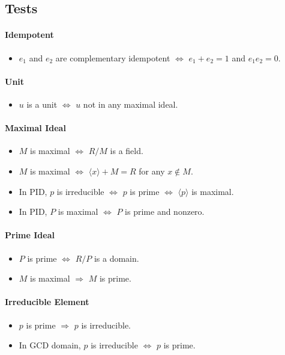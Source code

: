 \documentclass{article}
\begin{document}
\subsection*{Tests}

\paragraph*{Idempotent}
\begin{itemize}
    \item $e_1$ and $e_2$ are complementary idempotent $\Leftrightarrow$ $e_1+e_2=1$ and $e_1 e_2 = 0$.
\end{itemize}

\paragraph*{Unit}
\begin{itemize}
    \item $u$ is a unit $\Leftrightarrow$ $u$ not in any maximal ideal.
\end{itemize}

\paragraph*{Maximal Ideal}
\begin{itemize}
    \item $M$ is maximal $\Leftrightarrow$ $R/M$ is a field.
    \item $M$ is maximal $\Leftrightarrow$ $\langle x \rangle + M = R$ for any $x\notin M$.
    \item In PID, $p$ is irreducible $\Leftrightarrow$ $p$ is prime $\Leftrightarrow$ $\langle p \rangle$ is maximal.
    \item In PID, $P$ is maximal $\Leftrightarrow$ $P$ is prime and nonzero.
\end{itemize}

\paragraph*{Prime Ideal}
\begin{itemize}
    \item $P$ is prime $\Leftrightarrow$ $R/P$ is a domain.
    \item $M$ is maximal $\Rightarrow$ $M$ is prime.
\end{itemize}

\paragraph*{Irreducible Element}
\begin{itemize}
    \item $p$ is prime $\Rightarrow$ $p$ is irreducible.
    \item In GCD domain, $p$ is irreducible $\Leftrightarrow$ $p$ is prime.
\end{itemize}
\end{document}
